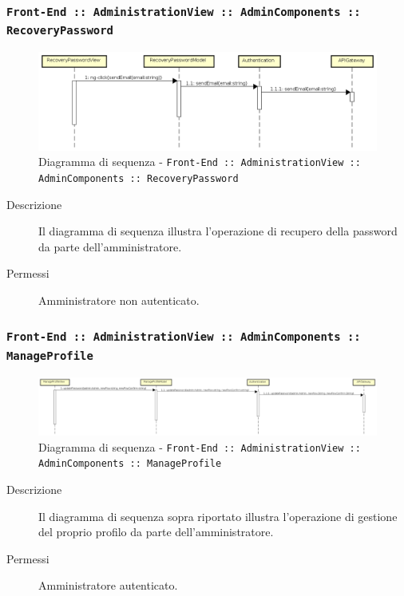 \documentclass[../DefinizioneDiProdotto.tex]{subfiles}
\begin{document}
		\subsubsection{\texttt{Front-End :: AdministrationView :: AdminComponents :: RecoveryPassword}}
		\begin{figure}[!h]
			\centering
			\includegraphics[width=\textwidth]{DiagrammiSequenza/Front-End/AdministrationView/RecoveryPassword.png}
			\caption{Diagramma di sequenza - \texttt{Front-End :: AdministrationView :: AdminComponents :: RecoveryPassword}}
		\end{figure}
		\begin{description}
			\item [Descrizione] Il diagramma di sequenza illustra l'operazione di recupero della password da parte dell'amministratore.
			\item [Permessi] Amministratore non autenticato.
		\end{description}

		\subsubsection{\texttt{Front-End :: AdministrationView :: AdminComponents :: ManageProfile}}
		\begin{figure}[!h]
			\centering
			\includegraphics[width=\textwidth]{DiagrammiSequenza/Front-End/AdministrationView/ManageProfile.png}
			\caption{Diagramma di sequenza - \texttt{Front-End :: AdministrationView :: AdminComponents :: ManageProfile }}
		\end{figure}
		\begin{description}
			\item [Descrizione] Il diagramma di sequenza sopra riportato illustra l'operazione di gestione del proprio profilo da parte dell'amministratore.
			\item [Permessi] Amministratore autenticato.
		\end{description}
\end{document}
